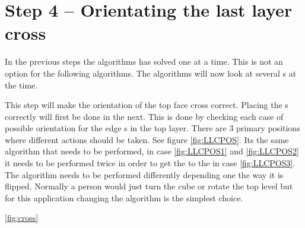 \section{Step 4 -- Orientating the last layer cross}
In the previous steps the algorithms has solved one \cpiece{} at a time. This is not an option for the following algorithms. The algorithms will now look at several \cpiece{}s at the time. 

This step will make the orientation of the top face cross correct. Placing the \cpiece{}s correctly will first be done in the next. This is done by checking each case of possible orientation for the edge \cpiece{}s in the top layer. There are 3 primary positions where different actions should be taken. See figure \ref{fig:LLCPOS}. Its the same algorithm that needs to be performed, in case \ref{fig:LLCPOS1} and \ref{fig:LLCPOS2} it needs to be performed twice in order to get the to the in case \ref{fig:LLCPOS3}. The algorithm needs to be performed differently depending one the way it is flipped. Normally a person would just turn the cube or rotate the top level but for this application changing the algorithm is the simplest choice. 

\ref{fig:cross}


